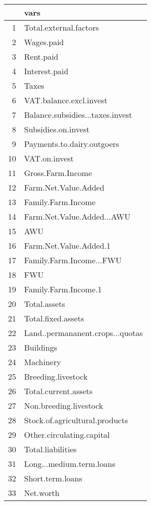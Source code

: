 \documentclass{article}\usepackage{graphicx, color}
\begin{document}
\begin{flushleft}
\newpage
\begin{table}[ht]
\begin{center}
\begin{tabular}{rl}
  \hline
 & vars \\ 
  \hline
1 & Total.external.factors \\ 
  2 & Wages.paid \\ 
  3 & Rent.paid \\ 
  4 & Interest.paid \\ 
  5 & Taxes \\ 
  6 & VAT.balance.excl.invest \\ 
  7 & Balance.subsidies...taxes.invest \\ 
  8 & Subsidies.on.invest \\ 
  9 & Payments.to.dairy.outgoers \\ 
  10 & VAT.on.invest \\ 
  11 & Gross.Farm.Income \\ 
  12 & Farm.Net.Value.Added \\ 
  13 & Family.Farm.Income \\ 
  14 & Farm.Net.Value.Added...AWU \\ 
  15 & AWU \\ 
  16 & Farm.Net.Value.Added.1 \\ 
  17 & Family.Farm.Income...FWU \\ 
  18 & FWU \\ 
  19 & Family.Farm.Income.1 \\ 
  20 & Total.assets \\ 
  21 & Total.fixed.assets \\ 
  22 & Land..permananent.crops...quotas \\ 
  23 & Buildings \\ 
  24 & Machinery \\ 
  25 & Breeding.livestock \\ 
  26 & Total.current.assets \\ 
  27 & Non.breeding.livestock \\ 
  28 & Stock.of.agricultural.products \\ 
  29 & Other.circulating.capital \\ 
  30 & Total.liabilities \\ 
  31 & Long...medium.term.loans \\ 
  32 & Short.term.loans \\ 
  33 & Net.worth \\ 

\end{tabular}
\end{center}
\end{table}
\end{flushleft}
\end{document}
